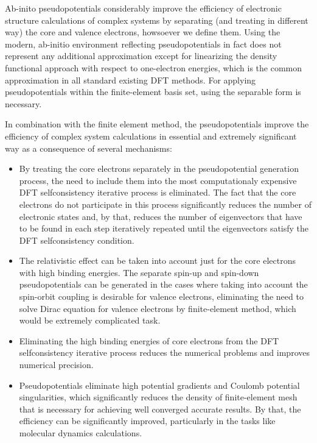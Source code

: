 Ab-inito pseudopotentials \cite{pickett} considerably improve the efficiency of
electronic structure calculations of complex systems by separating (and
treating in different way) the core and valence electrons, howsoever we define
them.  Using the modern, ab-initio environment reflecting pseudopotentials
\cite{vackarAEPP2} in fact does not represent any additional approximation
except for linearizing the density functional approach with respect to
one-electron energies, which is the common approximation in all standard
existing DFT methods.  For applying pseudopotentials within the finite-element
basis set, using the separable form is necessary.

In combination with the finite element method, the pseudopotentials improve the
efficiency of complex system calculations in essential and extremely
significant way as a consequence of several mechanisms:
\begin{itemize}

\item By treating the core electrons separately in the pseudopotential
generation process, the need to include them into the most computationaly
expensive DFT selfconsistency iterative process is eliminated.  The fact that
the core electrons do not participate in this process significantly reduces the
number of electronic states and, by that, reduces the number of eigenvectors
that have to be found in each step iteratively repeated until the eigenvectors
satisfy the DFT selfconsistency condition.

\item The relativistic effect can be taken into account just for the core
electrons with high binding energies. The separate spin-up and spin-down
pseudopotentials can be generated in the cases where taking into account the
spin-orbit coupling is desirable for valence electrons, eliminating the need to
solve Dirac equation for valence electrons by finite-element method, which
would be extremely complicated task.

\item Eliminating the high binding energies of core electrons from the DFT
selfconsistency iterative process reduces the numerical problems and improves
numerical precision.

\item Pseudopotentials eliminate high potential gradients and Coulomb potential
singularities, which significantly reduces the density of finite-element mesh
that is necessary for achieving well converged accurate results. By that, the
efficiency can be significantly improved, particularly in the tasks like
molecular dynamics calculations.

\end{itemize}
